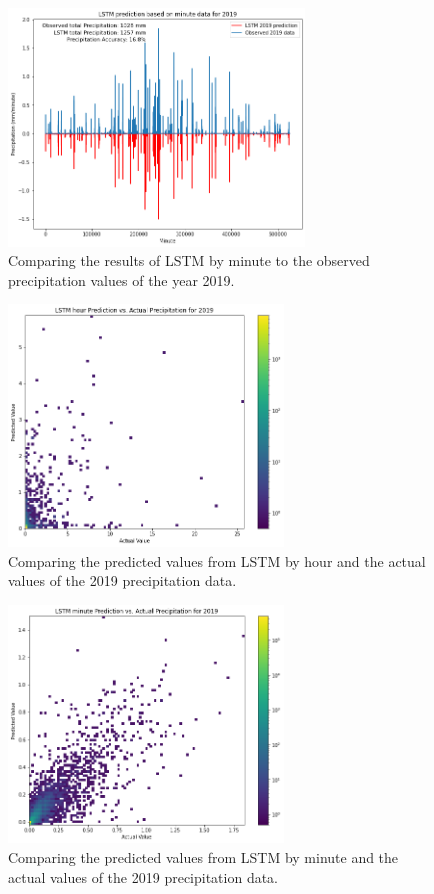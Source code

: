 \documentclass[11pt]{report}
\begin{document}
\begin{figure}[bh!]
	\centering
	\includegraphics[width = 0.7\textwidth]{Figures/LSTM_minute.png}
	\caption[Comparing LSTM results to observed precipitation in 2019 by minute]{\label{LSTM_minute}
		Comparing the results of LSTM by minute to the observed
		precipitation values of the year 2019.
	}
\end{figure}
\clearpage
\begin{figure}[th!]
	\centering
	\includegraphics[width = 0.65\textwidth]{Figures/LSTM_hour_compare.png}
	\caption[\label{LSTM_hour_compare}LSTM hour prediction vs. actual data]{
		Comparing the predicted values from LSTM by hour and the actual values of the 2019 precipitation data.
	}
\end{figure}

\begin{figure}[bh!]
	\centering
	\includegraphics[width = 0.65\textwidth]{Figures/LSTM_minute_compare.png}
	\caption[LSTM minute prediction vs. actual data ]{\label{LSTM_minute_compare}
		Comparing the predicted values from LSTM by minute and the actual values of the 2019 precipitation data.
	}
\end{figure}
\clearpage
\end{document}
